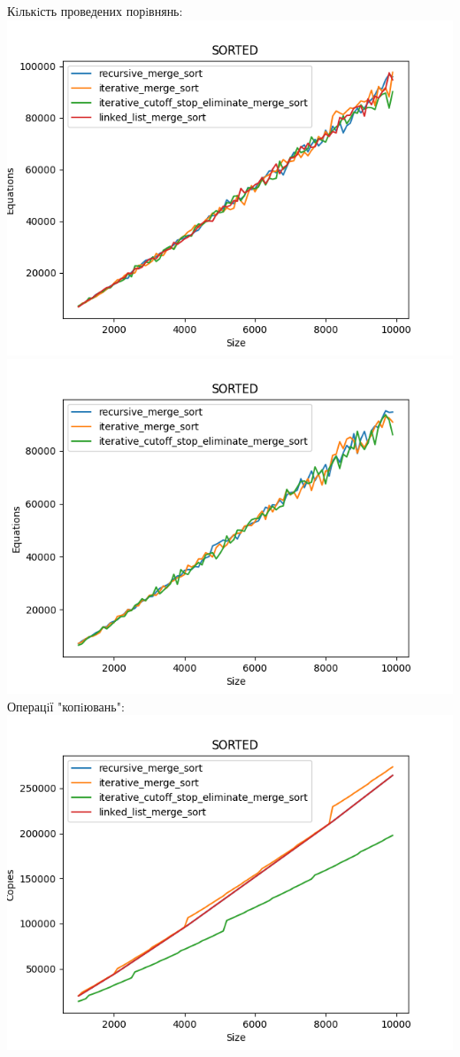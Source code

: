 \documentclass{article}
\begin{document}
        Кiлькiсть проведених порiвнянь:
        \newline
            \includegraphics[scale=0.5]{sorted_Equations_4_sorts_90_numbers_50.png}
            \includegraphics[scale=0.5]{sorted_Equations_3_sorts_90_numbers_50.png}
        \newpage
        Операцiї "копiювань":
        \newline
            \includegraphics[scale=0.5]{sorted_Copies_4_sorts_90_numbers_50.png}
\end{document}
